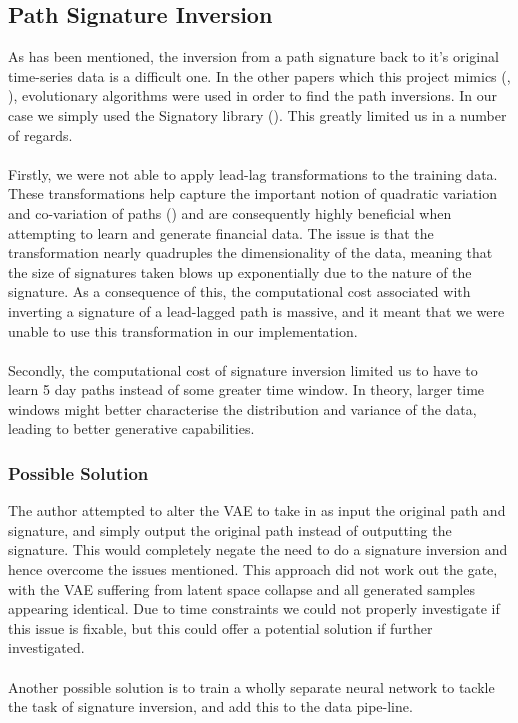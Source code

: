 \documentclass{article}
\theoremstyle{definition}
\begin{document}
\subsection{Path Signature Inversion}
As has been mentioned, the inversion from a path signature back to it's original time-series data is a difficult one. In the other papers which this project mimics (\cite{buehler2020generating}, \cite{stangroom2023deephedging}), evolutionary algorithms were used in order to find the path inversions. In our case we simply used the Signatory library (\cite{kidger2021signatory}). This greatly limited us in a number of regards.\\\\
Firstly, we were not able to apply lead-lag transformations to the training data. These transformations help capture the important notion of quadratic variation and co-variation of paths (\cite{gyurko2014extracting}) and are consequently highly beneficial when attempting to learn and generate financial data. The issue is that the transformation nearly quadruples the dimensionality of the data, meaning that the size of signatures taken blows up exponentially due to the nature of the signature. As a consequence of this, the computational cost associated with inverting a signature of a lead-lagged path is massive, and it meant that we were unable to use this transformation in our implementation. \\\\
Secondly, the computational cost of signature inversion limited us to have to learn 5 day paths instead of some greater time window. In theory, larger time windows might better characterise the distribution and variance of the data, leading to better generative capabilities.
\subsubsection{Possible Solution}
The author attempted to alter the VAE to take in as input the original path and signature, and simply output the original path instead of outputting the signature. This would completely negate the need to do a signature inversion and hence overcome the issues mentioned. This approach did not work out the gate, with the VAE suffering from latent space collapse and all generated samples appearing identical. Due to time constraints we could not properly investigate if this issue is fixable, but this could offer a potential solution if further investigated.\\\\
Another possible solution is to train a wholly separate neural network to tackle the task of signature inversion, and add this to the data pipe-line.
\end{document}
